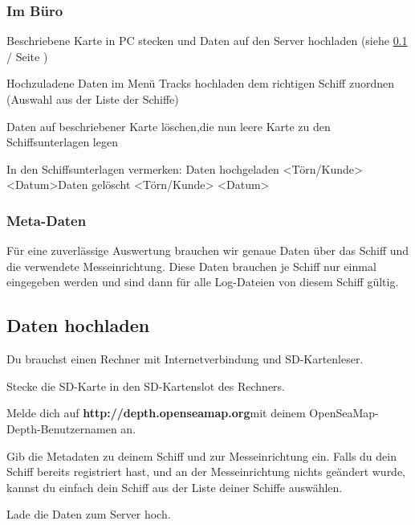\documentclass[pdftex, fontsize=8pt, paper=130mm:92mm,pagesize]{scrartcl}
\begin{document}
\subsubsection{Im Büro}

\begin{compactenum}
\item Beschriebene Karte in PC stecken und Daten auf den Server hochladen \newline(siehe \ref{sec:upload}  / Seite \pageref{sec:upload}) 
\item Hochzuladene Daten im Menü \glqq Tracks hochladen\grqq{} dem richtigen Schiff zuordnen (Auswahl aus der Liste der Schiffe) 
\item Daten auf beschriebener Karte löschen,\newline die nun leere Karte zu den Schiffsunterlagen legen 
\item In den Schiffsunterlagen vermerken: \newline Daten hochgeladen <Törn/Kunde> <Datum>\newline Daten gelöscht <Törn/Kunde> <Datum>
\end{compactenum}


\subsubsection{Meta-Daten}

Für eine zuverlässige Auswertung brauchen wir genaue Daten über das Schiff und die verwendete Messeinrichtung. Diese Daten brauchen je Schiff nur einmal eingegeben werden und sind dann für alle Log-Dateien von diesem Schiff gültig. 


\subsection{Daten hochladen}\label{sec:upload}

\begin{compactenum}
\item Du brauchst einen Rechner mit Internetverbindung und SD-Kartenleser.
\item Stecke die SD-Karte in den SD-Kartenslot des Rechners. 
\item Melde dich auf \textbf{http://depth.openseamap.org}\newline mit deinem OpenSeaMap-Depth-Benutzernamen an. 
\item Gib die Metadaten zu deinem Schiff und zur Messeinrichtung ein. Falls du dein Schiff bereits registriert hast, und an der Messeinrichtung nichts geändert wurde, kannst du einfach dein Schiff aus der Liste deiner Schiffe auswählen.
\item Lade die Daten zum Server hoch.
\end{compactenum}
\end{document}
